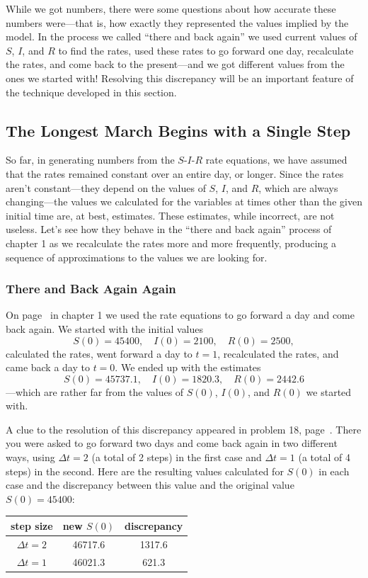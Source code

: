While we got numbers, there were some questions about how accurate
these numbers were---that is, how exactly they represented the values
implied by the model.  In the process we called ``there and back
again'' we used current values of $S$, $I$, and $R$ to find the rates,
used these rates to go forward one day, recalculate the rates, and
come back to the present---and we got different values from the ones
we started with!  Resolving this discrepancy will be an important
feature of the technique developed in this section.

\subsection{The Longest March Begins with a Single Step}
\label{subsec:the-longest-march-begins-with-a-single-step}

So far, in generating numbers from the $S$-$I$-$R$ rate equations, we
have assumed that the rates remained constant over an entire day, or
longer. Since the rates aren't constant---they depend on the values of
$S$, $I$, and $R$, which are always changing---the values we
calculated for the variables at times other than the given initial
time are, at best, estimates.  These estimates, while incorrect, are
not useless. Let's see how they behave in the ``there and back again''
process of chapter 1 as we recalculate the rates more and more
frequently, producing a sequence of approximations to the values we
are looking for.

\subsubsection{There and Back Again Again}
\label{subsubsec:there-and-back-again-again}

On page~\pageref{`thereback'} in chapter 1 we used the rate equations to
go forward a day and come back again.  We started with the initial
values
\[
S(0)=45400, \quad I(0) = 2100, \quad R(0) = 2500,
\]
calculated the rates, went forward a day to $t=1$, recalculated the
rates, and came back a day to $t=0$. We ended up with the estimates
\[
S(0)=45737.1, \quad I(0) = 1820.3, \quad R(0) = 2442.6
\]
---which are rather far from the values of $S(0)$, $I(0)$, and $R(0)$
we started with.

A clue to the resolution of this discrepancy appeared in problem 18,
page~\pageref{`therebackprob'}.  There you were asked to go forward two
days and come back again in two different ways, using $\Delta t=2$ (a
total of 2 steps) in the first case and $\Delta t=1$ (a total of 4
steps) in the second.  Here are the resulting values calculated for
$S(0)$ in each case and the discrepancy between this value and the
original value $S(0)=45400$:
\begin{center}


\begin{tabular}{ccc}
step size & new $S(0)$ & discrepancy \\[2pt] \hline
$\Delta t=2$ & 46717.6 & 1317.6\\
$\Delta t=1$ & 46021.3 & 621.3 \\
\end{tabular}
\end{center}

